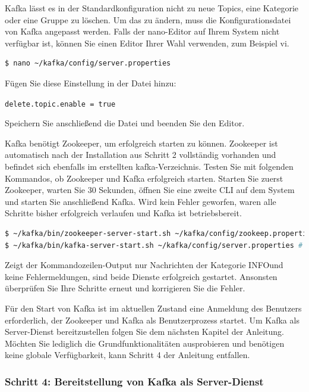 \documentclass[a4paper,titlepage,halfparskip,12pt]{scrreprt}
\begin{document}
\begin{onehalfspacing}
Kafka lässt es in der Standardkonfiguration nicht zu neue Topics, eine Kategorie oder eine Gruppe zu löschen. Um das zu ändern, muss die Konfigurationsdatei von Kafka angepasst werden. Falls der \glqq nano\grqq -Editor auf Ihrem System nicht verfügbar ist, können Sie einen Editor Ihrer Wahl verwenden, zum Beispiel \glqq vi\grqq.

\smallskip

\begin{lstlisting}[language=Bash]
$ nano ~/kafka/config/server.properties
\end{lstlisting}

Fügen Sie diese Einstellung in der Datei hinzu:

\texttt{delete.topic.enable = true}

Speichern Sie anschließend die Datei und beenden Sie den Editor.

Kafka benötigt Zookeeper, um erfolgreich starten zu können. Zookeeper ist automatisch nach der Installation aus Schritt 2 vollständig vorhanden und befindet sich ebenfalls im erstellten \glqq kafka\grqq -Verzeichnis. Testen Sie mit folgenden Kommandos, ob Zookeeper und Kafka erfolgreich starten. Starten Sie zuerst Zookeeper, warten Sie 30 Sekunden, öffnen Sie eine zweite CLI auf dem System und starten Sie anschließend Kafka. Wird kein Fehler geworfen, waren alle Schritte bisher erfolgreich verlaufen und Kafka ist betriebsbereit.

\smallskip

\begin{lstlisting}[language=Bash]
$ ~/kafka/bin/zookeeper-server-start.sh ~/kafka/config/zookeep.properties # Start: zookeeper
$ ~/kafka/bin/kafka-server-start.sh ~/kafka/config/server.properties # Start: kafka
\end{lstlisting}

Zeigt der Kommandozeilen-Output nur Nachrichten der Kategorie \glqq INFO\grqq und keine Fehlermeldungen, sind beide Dienste erfolgreich gestartet. Ansonsten überprüfen Sie Ihre Schritte erneut und korrigieren Sie die Fehler.

Für den Start von Kafka ist im aktuellen Zustand eine Anmeldung des Benutzers erforderlich, der Zookeeper und Kafka als Benutzerprozess startet. Um Kafka als Server-Dienst bereitzustellen folgen Sie dem nächsten Kapitel der Anleitung. Möchten Sie lediglich die Grundfunktionalitäten ausprobieren und benötigen keine globale Verfügbarkeit, kann Schritt 4 der Anleitung entfallen.

\subsubsection*{Schritt 4: Bereitstellung von Kafka als Server-Dienst}


\end{onehalfspacing}
\end{document}
